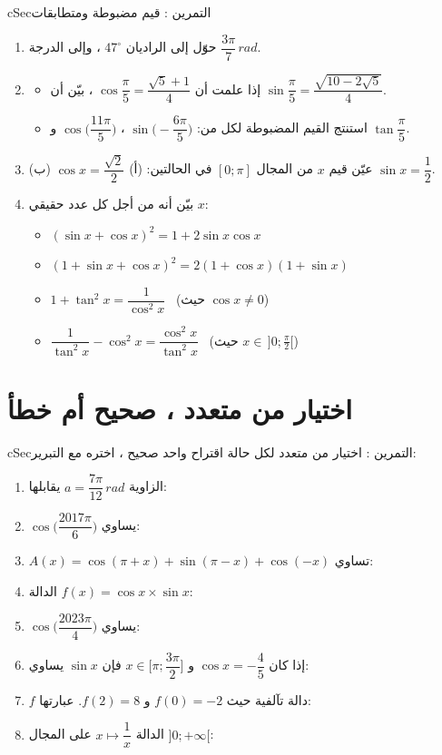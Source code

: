 \documentclass[12pt,a4paper]{article}
\newenvironment{BOX}[2]{\begin{otherlanguage}{english}\begin{arbox}{#1}{#2}}{\end{arbox}\end{otherlanguage}}
\newcounter{exo}
\newenvironment{tamrin}[1]{\stepcounter{exo}\begin{BOX}{cSec}{التمرين \theexo: #1}}{\end{BOX}}
\newenvironment{sq}{\begin{itemize}[leftmargin=2.4em,itemsep=3pt]}{\end{itemize}}
\newcommand{\qa}{\item[(أ)]}\newcommand{\qb}{\item[(ب)]}\newcommand{\qc}{\item[(جـ)]}\newcommand{\qd}{\item[(د)]}\newcommand{\qe}{\item[(هـ)]}
\begin{document}
\begin{tamrin}{قيم مضبوطة ومتطابقات}
\begin{enumerate}
\item حوّل إلى الراديان $47^\circ$ ، وإلى الدرجة $\dfrac{3\pi}7\,rad$.
\item
\begin{sq}
\qa إذا علمت أن $\cos\dfrac\pi5=\dfrac{\sqrt5+1}4$ ، بيّن أن $\sin\dfrac\pi5=\dfrac{\sqrt{10-2\sqrt5}}4$.
\qb استنتج القيم المضبوطة لكل من: $\sin\Big(-\dfrac{6\pi}5\Big)$ ، $\cos\Big(\dfrac{11\pi}5\Big)$ و $\tan\dfrac\pi5$.
\end{sq}
\item عيّن قيم $x$ من المجال $[0;\pi]$ في الحالتين: (أ) $\cos x=\dfrac{\sqrt2}2$ \quad (ب) $\sin x=\dfrac12$.
\item بيّن أنه من أجل كل عدد حقيقي $x$:
\begin{sq}
\qa $(\sin x+\cos x)^2=1+2\sin x\cos x$
\qb $(1+\sin x+\cos x)^2=2(1+\cos x)(1+\sin x)$
\qc $1+\tan^2x=\dfrac1{\cos^2x}$ \ (حيث $\cos x\ne0$)
\qd $\dfrac1{\tan^2x}-\cos^2x=\dfrac{\cos^2x}{\tan^2x}$ \ (حيث $x\in\,]0;\frac\pi2[$)
\end{sq}
\end{enumerate}
\end{tamrin}

\section{اختيار من متعدد ، صحيح أم خطأ}
\begin{tamrin}{اختيار من متعدد}
لكل حالة اقتراح واحد صحيح ، اختره مع التبرير:
\begin{enumerate}
\item الزاوية $a=\dfrac{7\pi}{12}\,rad$ يقابلها:
\item $\cos\Big(\dfrac{2017\pi}6\Big)$ يساوي:
\item $A(x)=\cos(\pi+x)+\sin(\pi-x)+\cos(-x)$ تساوي:
\item الدالة $f(x)=\cos x\times\sin x$:
\item $\cos\Big(\dfrac{2023\pi}4\Big)$ يساوي:
\item إذا كان $\cos x=-\dfrac45$ و $x\in\Big[\pi;\dfrac{3\pi}2\Big]$ فإن $\sin x$ يساوي:
\item $f$ دالة تآلفية حيث $f(0)=-2$ و $f(2)=8$. عبارتها:
\item الدالة $x\mapsto\dfrac1x$ على المجال $]0;+\infty[$:
\end{enumerate}
\end{tamrin}
\end{document}
